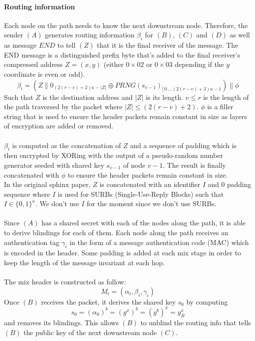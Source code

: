     \paragraph{Routing information}
    Each node on the path needs to know the next downstream node. Therefore, the sender $(A)$ generates routing information $\beta_i$ for $(B)$, $(C)$ and $(D)$ as well as message $END$ to tell $(Z)$ that it is the final receiver of the message. The END message is a distinguished prefix byte that's added to the final receiver's compressed address $Z=(x,y)$ (either $0\times02$ or $0\times03$ depending if the $y$ coordinate is even or odd).
    $$\beta_i=(Z\|0_{(2(r-v)+2)\kappa-|Z|}\oplus PRNG(s_{v-1})_{[ \,0....(2(r-v)+3)\kappa-1})\|\phi$$
    Such that $Z$ is the destination address and $|Z|$ is its length. 
$v\leq r$ is the length of the path traversed by the packet where $|Z| \leq (2(r - v) + 2)$. $\phi$ is a filler string that is used to ensure the header packets remain constant in size as layers of encryption are added or removed.
\\~\\$\beta_i$ is computed as the concatenation of $Z$ and a sequence of padding which is then encrypted by XORing with the output of a pseudo-random number generator seeded with shared key $s_{v-1}$ of node $v-1$. The result is finally concatenated with $\phi$ to ensure the header packets remain constant in size.
\\ In the original sphinx paper, $Z$ is concatenated with an identifier $I$ and $0$ padding sequence where $I$ is used for SURBs (Single-Use-Reply Blocks) such that $I \in \{0, 1\}^\kappa$. We don't use $I$ for the moment since we don't use SURBs.
\\~\\Since $(A)$ has a shared secret with each of the nodes along the path, it is able to derive blindings for each of them.
\newline Each node along the path receives an authentication tag $\gamma_i$ in the form of a message authentication code (MAC)
which is encoded in the header.
\newline Some padding is added at each mix stage in order to keep the length of the message invariant at each hop.
\\~\\The mix header is constructed as follow: $$M_i=(\alpha_i,\beta_i,\gamma_i)$$
\newline Once $(B)$ receives the packet, it derives the shared key $s_0$ by computing $$s_0=(\alpha_0)^b=(g^x)^b=(g^b)^x=y^x_B$$ and removes its blindings. This allows $(B)$ to unblind the routing info that tells $(B)$ the public key of the next downstream node $(C)$. 
